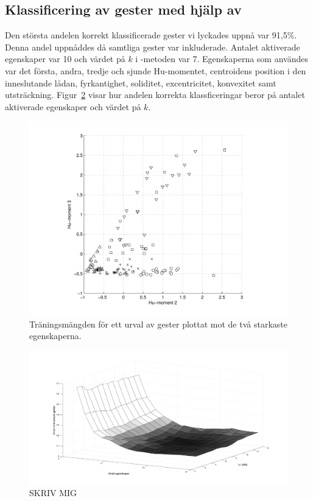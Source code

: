 \documentclass[../rapport_MVEX01-11-05]{subfiles}
\begin{document}
\subsection{Klassificering av gester med hjälp av \knn}
Den största andelen korrekt klassificerade gester vi lyckades uppnå var 91,5\%.
Denna andel uppnåddes då samtliga gester var inkluderade. Antalet aktiverade
egenskaper var 10 och värdet på $k$ i \knn-metoden var 7. Egenskaperna som
användes var det första, andra, tredje och sjunde Hu-momentet, centroidens
position i den inneslutande lådan, fyrkantighet, soliditet, excentricitet,
konvexitet samt utsträckning. Figur~\ref{fig:knn-optimering} visar hur andelen korrekta
klassficeringar beror på antalet aktiverade egenskaper och värdet på $k$.

\begin{figure}[tbp]
  \centering
  \includegraphics[width=\textwidth,trim=2cm 0.5cm 2cm 0]{bilder/feats-10+11}
  \caption{Träningsmängden för ett urval av gester plottat mot de två starkaste
  egenskaperna.}
  \label{fig:feats1011}
\end{figure}

\begin{figure}[tbp]
    \begin{center}
        \includegraphics[trim=2cm 2cm 2cm 2cm, width=\columnwidth]{bilder/knn_optimering}
    \end{center}
    \caption{SKRIV MIG}
    \label{fig:knn-optimering}
\end{figure}
\end{document}
